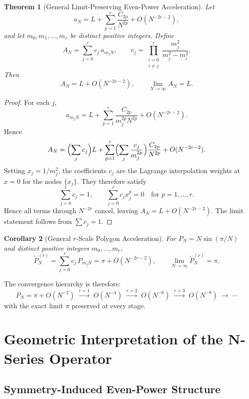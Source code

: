 \documentclass[12pt]{article}
\newtheorem{theorem}{Theorem}[section]
\newtheorem{corollary}[theorem]{Corollary}
\theoremstyle{remark}
\begin{document}
\begin{theorem}[General Limit-Preserving Even-Power Acceleration]
\label{thm:general}
Let
\[
  a_N = L + \sum_{p=1}^{r}\frac{C_{2p}}{N^{2p}} + O(N^{-2r-2}),
\]
and let $m_0, m_1, \dots, m_r$ be distinct positive integers. Define
\[
  A_N = \sum_{j=0}^r c_j\,a_{m_jN},
  \qquad
  c_j = \prod_{\substack{i=0\\i\neq j}}^{r}
        \frac{m_j^2}{m_j^2 - m_i^2}.
\]
Then
\[
  A_N = L + O(N^{-2r-2}),\qquad
  \lim_{N\to\infty}A_N = L.
\]
\end{theorem}

\begin{proof}
For each $j$,
\[
  a_{m_jN} = L + \sum_{p=1}^{r}\frac{C_{2p}}{m_j^{2p}N^{2p}} + O(N^{-2r-2}).
\]
Hence
\[
  A_N = \Bigl(\sum_{j}c_j\Bigr)L
      + \sum_{p=1}^{r}\Bigl(\sum_{j}\frac{c_j}{m_j^{2p}}\Bigr)
        \frac{C_{2p}}{N^{2p}} + O(N^{-2r-2}).
\]
Setting $x_j = 1/m_j^2$, the coefficients $c_j$ are the Lagrange interpolation
weights at $x=0$ for the nodes $\{x_j\}$. They therefore satisfy
\[
  \sum_{j=0}^r c_j = 1,\qquad
  \sum_{j=0}^r c_j x_j^p = 0\quad\text{for }p=1,\dots,r.
\]
Hence all terms through $N^{-2r}$ cancel, leaving $A_N = L + O(N^{-2r-2})$.
The limit statement follows from $\sum c_j = 1$.
\end{proof}

\begin{corollary}[General $r$-Scale Polygon Acceleration]
For $P_N = N\sin(\pi/N)$ and distinct positive integers $m_0,\dots,m_r$,
\[
  \widetilde{P}_N^{(r)}
  = \sum_{j=0}^r c_j\,P_{m_jN}
  = \pi + O(N^{-2r-2}),\qquad
  \lim_{N\to\infty}\widetilde{P}_N^{(r)} = \pi.
\]
\end{corollary}

The convergence hierarchy is therefore:
\[
  P_N = \pi + O(N^{-2})
  \;\xrightarrow{r=1}\; O(N^{-4})
  \;\xrightarrow{r=2}\; O(N^{-6})
  \;\xrightarrow{r=3}\; O(N^{-8})
  \;\to\;\cdots
\]
with the exact limit $\pi$ preserved at every stage.

\section{Geometric Interpretation of the N-Series Operator}

\subsection{Symmetry-Induced Even-Power Structure}
\end{document}
